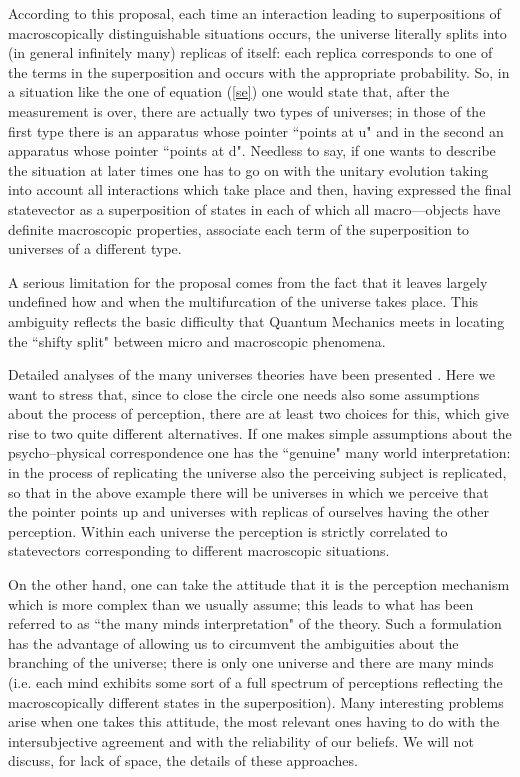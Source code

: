 \documentclass[12pt]{article}
\begin{document}
According to this proposal, each time an interaction leading to
superpositions of macroscopically distinguishable situations
occurs, the universe literally splits into (in general infinitely
many) replicas of itself: each replica corresponds to one of the
terms in the superposition and occurs with the appropriate
probability. So, in a situation like the one of equation
(\ref{se}) one would state that, after the measurement is over,
there are actually two types of universes; in those of the first
type there is an apparatus whose pointer ``points at u" and in the
second an apparatus whose pointer ``points at d". Needless to say,
if one wants to describe the situation at later times one has to
go on with the unitary evolution taking into account all
interactions which take place and then, having expressed the final
statevector as a superposition of states in each of which all
macro---objects have definite macroscopic properties, associate
each term of the superposition to universes of a different type.

A serious limitation for the proposal comes from the fact that it
leaves largely undefined how and when the multifurcation of the
universe takes place. This ambiguity reflects the basic difficulty
that Quantum Mechanics meets in locating the ``shifty split"
between micro and macroscopic phenomena.

Detailed analyses of the many universes theories have been
presented \cite{de1,al7,al5}. Here we want to stress that, since
to close the circle one needs also some assumptions about the
process of perception, there are at least two choices for this,
which give rise to two quite different alternatives. If one makes
simple assumptions about the psycho--physical correspondence one
has the ``genuine" many world interpretation: in the process of
replicating the universe also the perceiving subject is
replicated, so that in the above example there will be universes
in which we perceive that the pointer points up and universes with
replicas of ourselves having the other perception. Within each
universe the perception is strictly correlated to statevectors
corresponding to different macroscopic situations.

On the other hand, one can take the attitude that it is the
perception mechanism which is more complex than we usually assume;
this leads to what has been referred to as ``the many minds
interpretation" of the theory. Such a formulation has the
advantage of allowing us to circumvent the ambiguities about the
branching of the universe; there is only one universe and there
are many minds (i.e. each mind exhibits some sort of a full
spectrum of perceptions reflecting the macroscopically different
states in the superposition). Many interesting problems arise when
one takes this attitude, the most relevant ones having to do with
the intersubjective agreement and with the reliability of our
beliefs. We will not discuss, for lack of space, the details of
these approaches.
\end{document}
